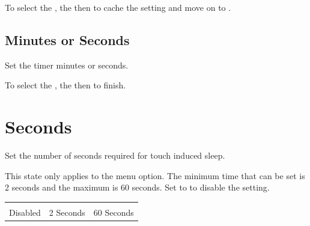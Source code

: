 To select the ,  the  then  to cache the setting
and move on to .


\subsection{Minutes or Seconds} 

Set the timer minutes or seconds.

\par\medskip

To select the ,  the  then  to finish.


\section{Seconds} 

Set the number of seconds required for touch induced sleep.

\par\medskip

This state only applies to the  menu option.  The minimum time that can
be set is \num{2} seconds and the maximum is \num{60} seconds.  Set to
 to disable the setting.

\begin{table}[H]
\centering
{}
\begin{tabu} to 5in {X[1,c,m] X[1,c,m] X[1,c,m]}
   &  &  \\
  \rowfont{\scriptsize} Disabled & 2 Seconds & 60 Seconds
\end{tabu}
\end{table}


